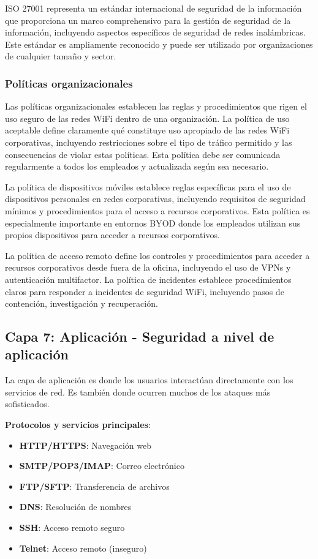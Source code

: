 ISO 27001 representa un estándar internacional de seguridad de la información que proporciona un marco comprehensivo para la gestión de seguridad de la información, incluyendo aspectos específicos de seguridad de redes inalámbricas. Este estándar es ampliamente reconocido y puede ser utilizado por organizaciones de cualquier tamaño y sector.

\subsubsection{Políticas organizacionales}

Las políticas organizacionales establecen las reglas y procedimientos que rigen el uso seguro de las redes WiFi dentro de una organización. La política de uso aceptable define claramente qué constituye uso apropiado de las redes WiFi corporativas, incluyendo restricciones sobre el tipo de tráfico permitido y las consecuencias de violar estas políticas. Esta política debe ser comunicada regularmente a todos los empleados y actualizada según sea necesario.

La política de dispositivos móviles establece reglas específicas para el uso de dispositivos personales en redes corporativas, incluyendo requisitos de seguridad mínimos y procedimientos para el acceso a recursos corporativos. Esta política es especialmente importante en entornos BYOD donde los empleados utilizan sus propios dispositivos para acceder a recursos corporativos.

La política de acceso remoto define los controles y procedimientos para acceder a recursos corporativos desde fuera de la oficina, incluyendo el uso de VPNs y autenticación multifactor. La política de incidentes establece procedimientos claros para responder a incidentes de seguridad WiFi, incluyendo pasos de contención, investigación y recuperación.

\subsection{Capa 7: Aplicación - Seguridad a nivel de aplicación}

La capa de aplicación es donde los usuarios interactúan directamente con los servicios de red. Es también donde ocurren muchos de los ataques más sofisticados.

\textbf{Protocolos y servicios principales}:
\begin{itemize}
    \item \textbf{HTTP/HTTPS}: Navegación web
    \item \textbf{SMTP/POP3/IMAP}: Correo electrónico
    \item \textbf{FTP/SFTP}: Transferencia de archivos
    \item \textbf{DNS}: Resolución de nombres
    \item \textbf{SSH}: Acceso remoto seguro
    \item \textbf{Telnet}: Acceso remoto (inseguro)
\end{itemize}


